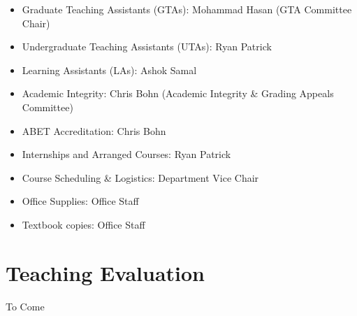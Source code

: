 \documentclass[12pt]{scrartcl}
\begin{document}
\begin{itemize}
  \item Graduate Teaching Assistants (GTAs): Mohammad Hasan (GTA Committee Chair)
  \item Undergraduate Teaching Assistants (UTAs): Ryan Patrick
  \item Learning Assistants (LAs): Ashok Samal
  \item Academic Integrity: Chris Bohn (Academic Integrity \& Grading Appeals Committee)
  \item ABET Accreditation: Chris Bohn
  \item Internships and Arranged Courses: Ryan Patrick
  \item Course Scheduling \& Logistics: Department Vice Chair
  \item Office Supplies: Office Staff
  \item Textbook copies: Office Staff
\end{itemize}

\section{Teaching Evaluation}

To Come
\end{document}
